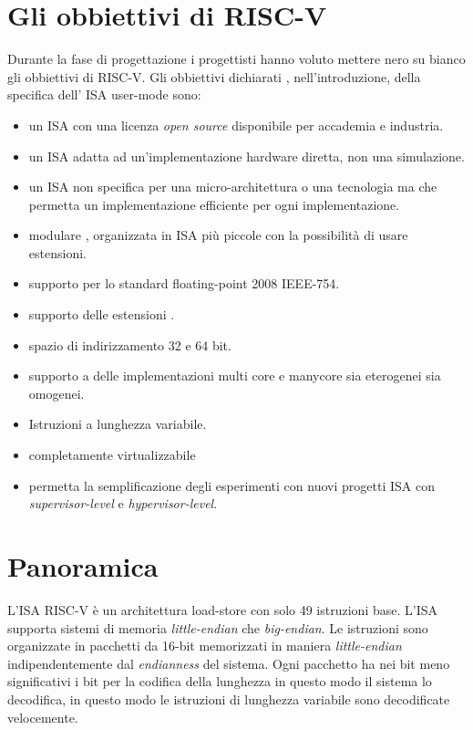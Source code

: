 \documentclass[12pt,a4paper]{report}
\begin{document}
\section{Gli obbiettivi di RISC-V}
Durante la fase di progettazione i progettisti hanno voluto mettere nero su bianco gli obbiettivi di RISC-V. Gli obbiettivi dichiarati , nell'introduzione, della specifica dell' ISA user-mode sono:
\begin{itemize}
	\item un ISA con una licenza \textit{open source} disponibile per accademia e industria.
	\item un ISA adatta ad un'implementazione hardware diretta, non una simulazione.
	\item un ISA non specifica per una micro-architettura o una tecnologia ma che permetta un implementazione efficiente per ogni implementazione.
	\item modulare , organizzata in ISA più piccole con la possibilità di usare estensioni.
	\item supporto per lo standard floating-point 2008 IEEE-754.
	\item supporto delle estensioni .
	\item spazio di indirizzamento 32 e 64 bit.
	\item supporto a delle implementazioni multi core e manycore sia eterogenei sia omogenei.
	\item Istruzioni a lunghezza variabile.
	\item completamente virtualizzabile 
	\item permetta la semplificazione degli esperimenti con nuovi progetti ISA con \textit{supervisor-level} e \textit{hypervisor-level}. 
	
\end{itemize}

\section{Panoramica}
L'ISA RISC-V è un architettura load-store con solo 49 istruzioni base. L'ISA supporta sistemi di memoria \textit{little-endian} che \textit{big-endian}. Le istruzioni sono organizzate in pacchetti da 16-bit memorizzati in maniera \textit{little-endian} indipendentemente dal \textit{endianness} del sistema.  Ogni pacchetto ha nei bit meno significativi i bit per la codifica della lunghezza in questo modo il sistema lo decodifica, in questo modo le istruzioni di lunghezza variabile sono decodificate velocemente.
\end{document}
